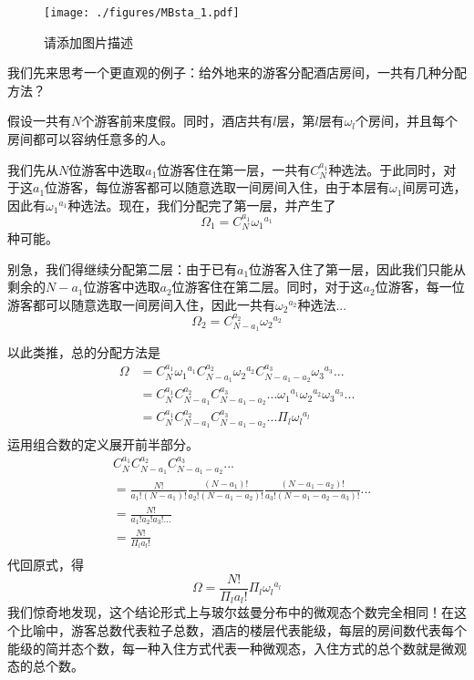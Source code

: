 \begin{example}{}
\begin{figure}[ht]
\centering
\texttt{[image: ./figures/MBsta\_1.pdf]}
\caption{请添加图片描述} \label{MBsta_fig1}
\end{figure}
我们先来思考一个更直观的例子：给外地来的游客分配酒店房间，一共有几种分配方法？

假设一共有$N$个游客前来度假。同时，酒店共有$l$层，第$l$层有$\omega_l$个房间，并且每个房间都可以容纳任意多的人。

我们先从$N$位游客中选取$a_1$位游客住在第一层，一共有$C_N^{a_1}$种选法。于此同时，对于这$a_1$位游客，每位游客都可以随意选取一间房间入住，由于本层有$\omega_1$间房可选，因此有${\omega_1}^{a_1}$种选法。现在，我们分配完了第一层，并产生了$$\Omega_1 = C_N^{a_1} {\omega_1}^{a_1}$$种可能。

别急，我们得继续分配第二层：由于已有$a_1$位游客入住了第一层，因此我们只能从剩余的$N-a_1$位游客中选取$a_2$位游客住在第二层。同时，对于这$a_2$位游客，每一位游客都可以随意选取一间房间入住，因此一共有${\omega_2}^{a_2}$种选法...
$$\Omega_2 = C_{N-a_1}^{a_2} {\omega_2}^{a_2}$$

以此类推，总的分配方法是
$$
\begin{aligned}
\Omega &= C_N^{a_1} {\omega_1}^{a_1} C_{N-a_1}^{a_2} {\omega_2}^{a_2} C_{N-a_1-a_2}^{a_3} {\omega_3}^{a_3}...\\
&=C_N^{a_1} C_{N-a_1}^{a_2} C_{N-a_1-a_2}^{a_3} ... {\omega_1}^{a_1}{\omega_2}^{a_2}  {\omega_3}^{a_3}...\\
& = C_N^{a_1} C_{N-a_1}^{a_2} C_{N-a_1-a_2}^{a_3} ... \Pi_l{\omega_l}^{a_l}\\
\end{aligned}
$$
运用组合数的定义展开前半部分。
$$
\begin{aligned}
& C_N^{a_1} C_{N-a_1}^{a_2} C_{N-a_1-a_2}^{a_3} ...\\
&= \frac{N!}{a_1!(N-a_1)!} 
\frac{(N-a_1)!}{a_2!(N-a_1-a_2)!}
\frac{(N-a_1-a_2)!}{a_3!(N-a_1-a_2-a_3)!}
...\\
&=\frac{N!}{a_1!a_2!a_3!...} \\
&=\frac{N!}{\Pi_l a_l!} \\
\end{aligned}
$$
代回原式，得
$$
\Omega = \frac{N!}{\Pi_l a_l!}  \Pi_l{\omega_l}^{a_l}
$$
我们惊奇地发现，这个结论形式上与玻尔兹曼分布中的微观态个数完全相同！在这个比喻中，游客总数代表粒子总数，酒店的楼层代表能级，每层的房间数代表每个能级的简并态个数，每一种入住方式代表一种微观态，入住方式的总个数就是微观态的总个数。

\end{example}


